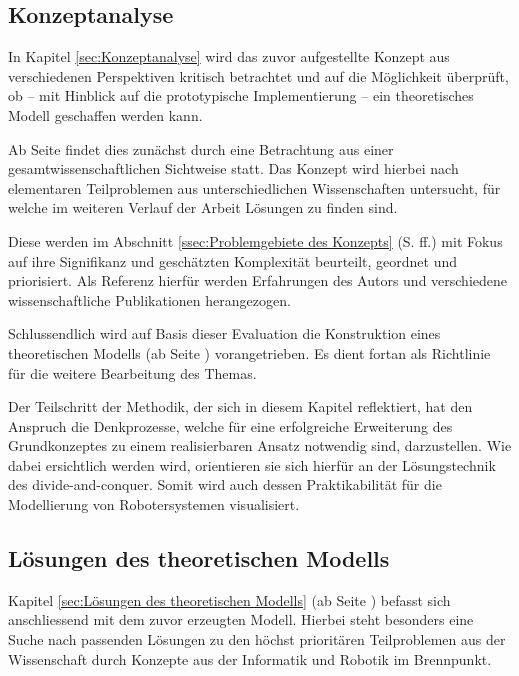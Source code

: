 \documentclass[fontsize=11pt,paper=a4,twoside,openright]{scrreprt}
\begin{document}
\subsection{Konzeptanalyse}
\label{sssec:Konzeptanalyse}

In Kapitel \ref{sec:Konzeptanalyse} wird das zuvor aufgestellte Konzept aus verschiedenen Perspektiven kritisch betrachtet und auf die Möglichkeit überprüft, ob -- mit Hinblick auf die prototypische Implementierung -- ein theoretisches Modell geschaffen werden kann.

Ab Seite \pageref{ssec:Sichtweise aus der Informatik Wissenschaft} findet dies zunächst durch eine Betrachtung aus einer gesamtwissenschaftlichen Sichtweise statt.
Das Konzept wird hierbei nach elementaren Teilproblemen aus unterschiedlichen Wissenschaften untersucht, für welche im weiteren Verlauf der Arbeit Lösungen zu finden sind.

Diese werden im Abschnitt \ref{ssec:Problemgebiete des Konzepts} (S. \pageref{ssec:Problemgebiete des Konzepts} ff.) mit Fokus auf ihre Signifikanz und geschätzten Komplexität beurteilt, geordnet und priorisiert.
Als Referenz hierfür werden Erfahrungen des Autors und verschiedene wissenschaftliche Publikationen herangezogen.

Schlussendlich wird auf Basis dieser Evaluation die Konstruktion eines theoretischen Modells (ab Seite \pageref{ssec:Konstruktion des theoretischen Modells}) vorangetrieben.
Es dient fortan als Richtlinie für die weitere Bearbeitung des Themas.

Der Teilschritt der Methodik, der sich in diesem Kapitel reflektiert, hat den Anspruch die Denkprozesse, welche für eine erfolgreiche Erweiterung des Grundkonzeptes zu einem realisierbaren Ansatz notwendig sind, darzustellen.
Wie dabei ersichtlich werden wird, orientieren sie sich hierfür an der Lösungstechnik des divide-and-conquer.
Somit wird auch dessen Praktikabilität für die Modellierung von Robotersystemen visualisiert.

\subsection{Lösungen des theoretischen Modells}
\label{sssec:Lösungen des theoretischen Modells}

Kapitel \ref{sec:Lösungen des theoretischen Modells} (ab Seite \pageref{sec:Lösungen des theoretischen Modells}) befasst sich anschliessend mit dem zuvor erzeugten Modell.
Hierbei steht besonders eine Suche nach passenden Lösungen zu den höchst prioritären Teilproblemen aus der Wissenschaft durch Konzepte aus der Informatik und Robotik im Brennpunkt.
\end{document}
